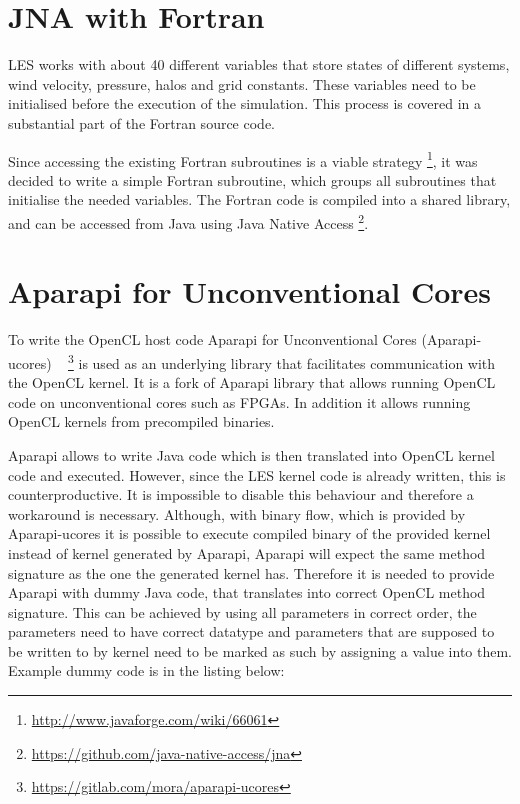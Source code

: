 \documentclass{l4proj}
\begin{document}
\section{JNA with Fortran}

LES works with about 40 different variables that store states of different systems,
wind velocity, pressure, halos and grid constants. These variables need to be initialised
before the execution of the simulation. This process is covered in a substantial part of
the Fortran source code.

Since accessing the existing Fortran subroutines is a viable strategy
\footnote{\url{http://www.javaforge.com/wiki/66061}},
it was decided to write a simple Fortran subroutine, which groups 
all subroutines that initialise the needed variables. The Fortran code
is compiled into a shared library, and can be accessed from Java using
Java Native Access \footnote{\url{https://github.com/java-native-access/jna}}.

\section{Aparapi for Unconventional Cores}

To write the OpenCL host code Aparapi for Unconventional Cores (Aparapi-ucores)
~\cite{aparapi_ucores}
\footnote{\url{https://gitlab.com/mora/aparapi-ucores}}
is used as an underlying library that facilitates communication
with the OpenCL kernel. It is a fork of Aparapi library that allows
running OpenCL code on unconventional cores such as FPGAs. In addition
it allows running OpenCL kernels from precompiled binaries.

Aparapi allows to write Java code which is then translated into OpenCL kernel code
and executed. However, since the LES kernel code is already written, this is 
counterproductive. It is impossible to disable this behaviour and therefore a 
workaround is necessary. Although, with binary flow, which is provided by Aparapi-ucores
it is possible to execute compiled binary of the provided kernel instead of 
kernel generated by Aparapi, Aparapi will expect the same method signature as 
the one the generated kernel has. Therefore it is needed to provide Aparapi with
dummy Java code, that translates into correct OpenCL method signature.
This can be achieved by using all parameters in correct order, the parameters
need to have correct datatype and parameters that are supposed to be written to
by kernel need to be marked as such by assigning a value into them. Example dummy
code is in the listing below:
\end{document}
